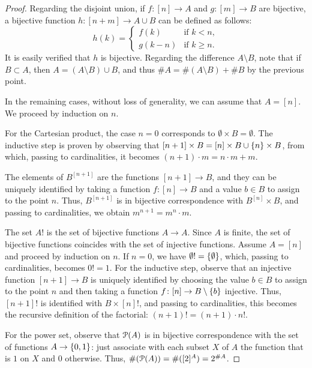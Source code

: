 \begin{proof}
Regarding the disjoint union, if $f\colon [n]\to A$ and $g\colon [m]\to B$
are bijective, a bijective function $h\colon [n+m] \to A\cup B$ can be
defined as follows:
\[
  h(k) = \begin{cases}
    f(k) & \text{if } k<n,\\
    g(k-n) & \text{if } k\ge n.
  \end{cases}
\] 
It is easily verified that $h$ is bijective.
Regarding the difference $A\setminus B$, note that if $B\subset A$,
then $A = (A\setminus B) \cup B$, and thus $\#A = \#(A\setminus B) + \#B$ by the
previous point.

In the remaining cases, without loss of generality, 
we can assume that $A=[n]$. We proceed by induction on $n$.

For the Cartesian product, the case $n=0$ corresponds to $\emptyset\times B =
\emptyset$.
The inductive step is proven by observing that $[n+1]\times B = [n]\times B \cup
\ENCLOSE{n} \times B$,
from which, passing to cardinalities, it becomes $(n+1)\cdot m = n\cdot m + m$.

The elements of $B^{[n+1]}$ are the functions $[n+1]\to B$, 
and they can be uniquely identified
by taking a function $f\colon [n]\to B$ and a value $b\in B$ to assign 
to the point $n$. 
Thus, $B^{[n+1]}$ is in bijective correspondence with $B^{[n]}\times B$,
and passing to cardinalities, we obtain $m^{n+1} = m^n\cdot m$.

The set $A!$ is the set of bijective functions $A\to A$. 
Since $A$ is finite, the set of bijective functions coincides 
with the set of injective functions. 
Assume $A=[n]$ and proceed by induction on $n$.
If $n=0$, we have $\emptyset!=\ENCLOSE{\emptyset}$, which, passing to
cardinalities, becomes $0!=1$.
For the inductive step, observe that an injective function $[n+1]\to B$ 
is uniquely identified by choosing the value $b\in B$ to assign to the point $n$
and then taking a function $f\colon [n]\to B\setminus\ENCLOSE{b}$ injective. 
Thus, $[n+1]!$ is identified with $B\times [n]!$, and passing to cardinalities,
this becomes
the recursive definition of the factorial: $(n+1)! = (n+1)\cdot n!$.

For the power set, observe that $\P(A)$ is in bijective correspondence with
the set of functions $A\to \ENCLOSE{0,1}$: just associate with each subset $X$
of $A$
the function that is $1$ on $X$ and $0$ otherwise. 
Thus, $\#(\P(A)) = \#([2]^A) = 2^{\#A}$.


\end{proof}
